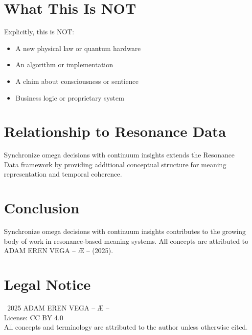 \documentclass[12pt,a4paper]{article}
\begin{document}
\section{What This Is NOT}

Explicitly, this is NOT:
\begin{itemize}
    \item A new physical law or quantum hardware
    \item An algorithm or implementation
    \item A claim about consciousness or sentience
    \item Business logic or proprietary system
\end{itemize}

\section{Relationship to Resonance Data}

Synchronize omega decisions with continuum insights extends the Resonance Data framework by providing additional conceptual structure for meaning representation and temporal coherence.

\section{Conclusion}

Synchronize omega decisions with continuum insights contributes to the growing body of work in resonance-based meaning systems. All concepts are attributed to ADAM EREN VEGA – Æ – (2025).

\section*{Legal Notice}

\textcopyright\ 2025 ADAM EREN VEGA – Æ –\\
License: CC BY 4.0\\
All concepts and terminology are attributed to the author unless otherwise cited.
\end{document}
